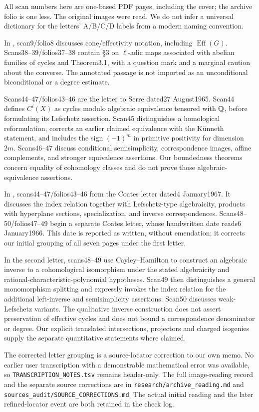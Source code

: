 All scan numbers here are one-based PDF pages, including the cover; the archive folio is one less. The original images were read. We do not infer a universal dictionary for the letters' A/B/C/D labels from a modern naming convention.

In \cite{GrothArchive14}, scan9/folio8 discusses cone/effectivity notation, including $\operatorname{Eff}(G)$. Scans38--39/folios37--38 contain \S3 on $\ell$-adic maps associated with abelian families of cycles and Theorem3.1, with a question mark and a marginal caution about the converse. The annotated passage is not imported as an unconditional biconditional or a degree estimate.

Scans44--47/folios43--46 are the letter to Serre dated27 August1965. Scan44 defines $C^i(X)$ as cycles modulo algebraic equivalence tensored with $\mathbb Q$, before formulating its Lefschetz assertion. Scan45 distinguishes a homological reformulation, corrects an earlier claimed equivalence with the K\"unneth statement, and includes the sign $(-1)^m$ in primitive positivity for dimension $2m$. Scans46--47 discuss conditional semisimplicity, correspondence images, affine complements, and stronger equivalence assertions. Our boundedness theorems concern equality of cohomology classes and do not prove those algebraic-equivalence assertions.

In \cite{GrothArchive16}, scans44--47/folios43--46 form the Coates letter dated4 January1967. It discusses the index relation together with Lefschetz-type algebraicity, products with hyperplane sections, specialization, and inverse correspondences. Scans48--50/folios47--49 begin a separate Coates letter, whose handwritten date reads6 January1966. This date is reported as written, without emendation; it corrects our initial grouping of all seven pages under the first letter.

In the second letter, scans48--49 use Cayley--Hamilton to construct an algebraic inverse to a cohomological isomorphism under the stated algebraicity and rational-characteristic-polynomial hypotheses. Scan49 then distinguishes a general monomorphism splitting and expressly invokes the index relation for the additional left-inverse and semisimplicity assertions. Scan50 discusses weak-Lefschetz variants. The qualitative inverse construction does not assert preservation of effective cycles and does not bound a correspondence denominator or degree. Our explicit translated intersections, projectors and charged isogenies supply the separate quantitative statements where claimed.

The corrected letter grouping is a source-locator correction to our own memo. No earlier user transcription with a demonstrable mathematical error was available, so \texttt{TRANSCRIPTION\_NOTES.tsv} remains header-only. The full image-reading record and the separate source corrections are in \texttt{research/archive\_reading.md} and \texttt{sources\_audit/SOURCE\_CORRECTIONS.md}. The actual initial reading and the later refined-locator event are both retained in the check log.
